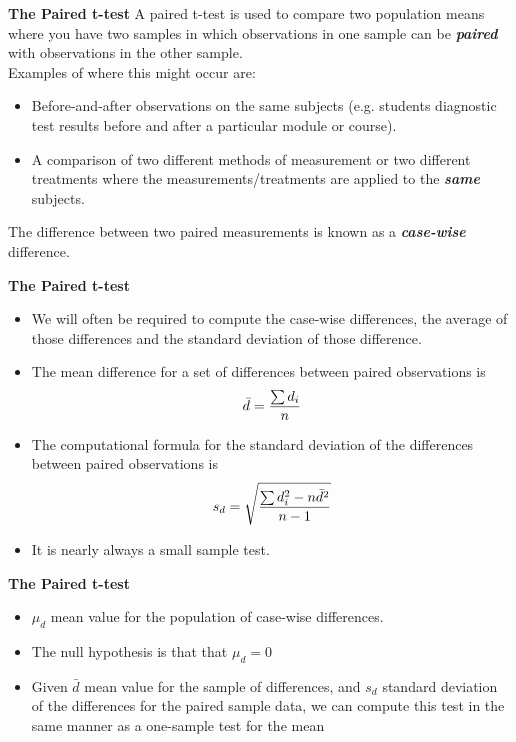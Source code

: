 {
\noindent \textbf{The Paired t-test}
A paired t-test is used to compare two population means where you have two samples in
which observations in one sample can be \textbf{\emph{paired}} with observations in the other sample.\\
\bigskip
Examples of where this might occur are:
\begin{itemize}
\item Before-and-after observations on the same subjects (e.g. students diagnostic test
results before and after a particular module or course).
\item A comparison of two different methods of measurement or two different treatments
where the measurements/treatments are applied to the \textbf{\emph{same}} subjects.
\end{itemize}
The difference between two paired measurements is known as a \textbf{\emph{case-wise}} difference.
}




\noindent \textbf{The Paired t-test}
\begin{itemize}
\item We will often be required to compute the case-wise differences, the average of those differences and the standard deviation of those difference.

\item The mean difference for a set of differences between paired observations is
\[ \bar{d} = {\sum d_i \over n }\]

\item The computational formula for the standard deviation of the differences
between paired observations is
\[s_d = \sqrt{ {\sum d_i^2 - n\bar{d}^2 \over n-1}}\]
\item It is nearly always a small sample test.
\end{itemize}



{
\noindent \textbf{The Paired t-test}
\begin{itemize}
\item $\mu_d$ mean value for the population of case-wise differences.
\item The null hypothesis is that that $\mu_d = 0$
\item Given $\bar{d}$ mean value for the sample of differences, and $s_d$ standard deviation of the differences for the paired sample data, we can compute this test in the same manner as a one-sample test for the mean
\end{itemize}
}



